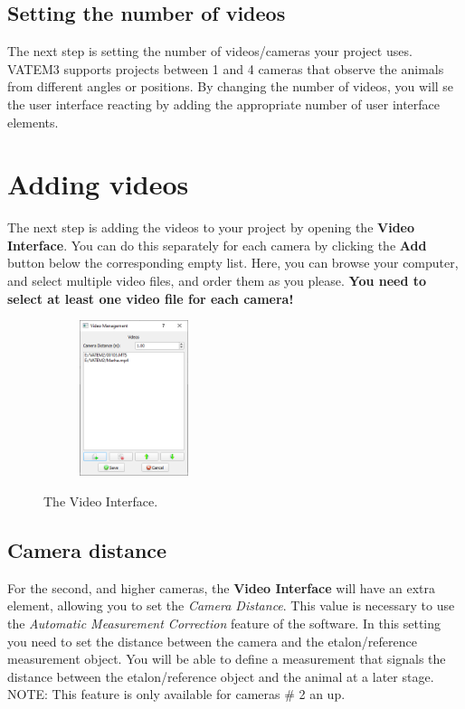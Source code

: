 \documentclass[10pt,a4paper,oneside]{report}             %
\newcommand*{\img}[1]{%
	\raisebox{-.02\baselineskip}{%
		\texttt{[image: \#1]}%
	}%
}
\begin{document}
\subsection{Setting the number of videos}

The next step is setting the number of videos/cameras your project uses. VATEM3 supports projects between 1 and 4 cameras that observe the animals from different angles or positions. By changing the number of videos, you will se the user interface reacting by adding the appropriate number of user interface elements.

\section{Adding videos}

The next step is adding the videos to your project by opening the \textbf{Video Interface}. You can do this separately for each camera by clicking the \textbf{Add} \img{../VAM/Icons/1462036180_list-add.png} button below the corresponding empty list. Here, you can browse your computer, and select multiple video files, and order them as you please. \textbf{You need to select at least one video file for each camera!}

\begin{figure}[H]
	\centering
	\begin{subfigure}{\textwidth}
		\centering 
		\includegraphics[width=0.35\textwidth]{./images/AddVid.png}
	\end{subfigure}
	\caption[]
	{\small  The Video Interface.}
\end{figure} 

\subsection{Camera distance}

For the second, and higher cameras, the \textbf{Video Interface} will have an extra element, allowing you to set the \textit{Camera Distance}. This value is necessary to use the \textit{Automatic Measurement Correction} feature of the software. In this setting you need to set the distance between the camera and the etalon/reference measurement object. You will be able to define a measurement that signals the distance between the etalon/reference object and the animal at a later stage. NOTE: This feature is only available for cameras \# 2 an up. 
\end{document}

